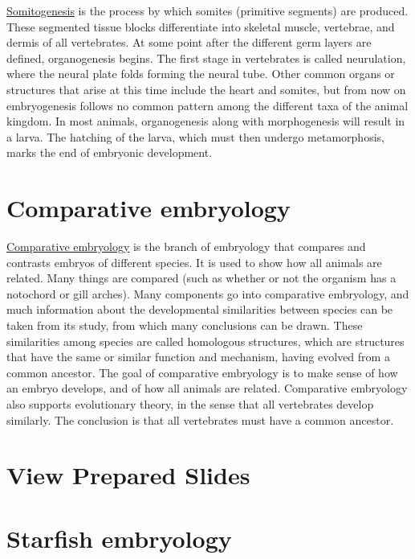\href{https://en.wikipedia.org/wiki/Somitogenesis}{Somitogenesis} is the
process by which somites (primitive segments) are produced. These
segmented tissue blocks differentiate into skeletal muscle, vertebrae,
and dermis of all vertebrates. At some point after the different germ
layers are defined, organogenesis begins. The first stage in vertebrates
is called neurulation, where the neural plate folds forming the neural
tube. Other common organs or structures that arise at this time include
the heart and somites, but from now on embryogenesis follows no common
pattern among the different taxa of the animal kingdom. In most animals,
organogenesis along with morphogenesis will result in a larva. The
hatching of the larva, which must then undergo metamorphosis, marks the
end of embryonic development.

\section{Comparative embryology}\label{comparative-embryology}

\href{https://en.wikipedia.org/wiki/Comparative_embryology}{Comparative
embryology} is the branch of embryology that compares and contrasts
embryos of different species. It is used to show how all animals are
related. Many things are compared (such as whether or not the organism
has a notochord or gill arches). Many components go into comparative
embryology, and much information about the developmental similarities
between species can be taken from its study, from which many conclusions
can be drawn. These similarities among species are called homologous
structures, which are structures that have the same or similar function
and mechanism, having evolved from a common ancestor. The goal of
comparative embryology is to make sense of how an embryo develops, and
of how all animals are related. Comparative embryology also supports
evolutionary theory, in the sense that all vertebrates develop
similarly. The conclusion is that all vertebrates must have a common
ancestor.

\section{View Prepared Slides}\label{view-prepared-slides-2}

\section{Starfish embryology}\label{starfish-embryology}

